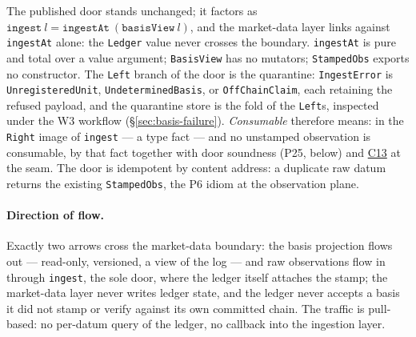 \documentclass[11pt,a4paper]{article}
\begin{document}
The published door stands unchanged; it factors as
$\texttt{ingest}\ l=\texttt{ingestAt}\ (\texttt{basisView}\ l)$, and the market-data
layer links against \texttt{ingestAt} alone: the \texttt{Ledger} value never crosses
the boundary. \texttt{ingestAt} is pure and total over a value argument;
\texttt{BasisView} has no mutators; \texttt{StampedObs} exports no constructor. The
\texttt{Left} branch of the door is the quarantine: \texttt{IngestError} is
\texttt{UnregisteredUnit}, \texttt{UndeterminedBasis}, or \texttt{OffChainClaim},
each retaining the refused payload, and the quarantine store is the fold of the
\texttt{Left}s, inspected under the W3 workflow (\S\ref{sec:basis-failure}).
\emph{Consumable} therefore means: in the \texttt{Right} image of \texttt{ingest} ---
a type fact --- and no unstamped observation is consumable, by that fact together
with door soundness (P25, below) and \hyperref[cond:C13]{C13} at the seam. The door
is idempotent by content address: a duplicate raw datum returns the existing
\texttt{StampedObs}, the P6 idiom at the observation plane.

\paragraph{Direction of flow.} Exactly two arrows cross the market-data boundary:
the basis projection flows out --- read-only, versioned, a view of the log --- and
raw observations flow in through \texttt{ingest}, the sole door, where the ledger
itself attaches the stamp; the market-data layer never writes ledger state, and the
ledger never accepts a basis it did not stamp or verify against its own committed
chain. The traffic is pull-based: no per-datum query of the ledger, no callback into
the ingestion layer.
\end{document}
